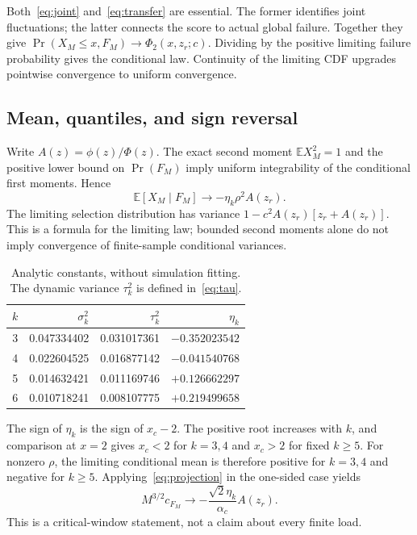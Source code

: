 \documentclass[11pt,a4paper]{article}
\newcommand{\E}{\mathbb E}
\begin{document}
Both~\eqref{eq:joint} and~\eqref{eq:transfer} are essential. The former identifies joint fluctuations; the latter connects the score to actual global failure. Together they give
$\Pr(X_M\le x,F_M)\to\Phi_2(x,z_r;c)$. Dividing by the positive limiting failure probability gives the conditional law. Continuity of the limiting CDF upgrades pointwise convergence to uniform convergence.

\subsection{Mean, quantiles, and sign reversal}
Write $A(z)=\phi(z)/\Phi(z)$. The exact second moment $\E X_M^2=1$ and the positive lower bound on $\Pr(F_M)$ imply uniform integrability of the conditional first moments. Hence
\begin{equation}
\E[X_M\mid F_M]\longrightarrow-\eta_k\rho^2A(z_r).\label{eq:mean}
\end{equation}
The limiting selection distribution has variance
$1-c^2A(z_r)[z_r+A(z_r)]$. This is a formula for the limiting law; bounded second moments alone do not imply convergence of finite-sample conditional variances.

\begin{table}[tbp]
\centering
\caption{Analytic constants, without simulation fitting. The dynamic variance $\tau_k^2$ is defined in~\eqref{eq:tau}.}
\begin{tabular}{rrrr}
\toprule
$k$ & $\sigma_k^2$ & $\tau_k^2$ & $\eta_k$\\
\midrule
3 & 0.047334402 & 0.031017361 & $-0.352023542$\\
4 & 0.022604525 & 0.016877142 & $-0.041540768$\\
5 & 0.014632421 & 0.011169746 & $+0.126662297$\\
6 & 0.010718241 & 0.008107775 & $+0.219499658$\\
\bottomrule
\end{tabular}
\end{table}

The sign of $\eta_k$ is the sign of $x_c-2$. The positive root increases with $k$, and comparison at $x=2$ gives $x_c<2$ for $k=3,4$ and $x_c>2$ for fixed $k\ge5$. For nonzero $\rho$, the limiting conditional mean is therefore positive for $k=3,4$ and negative for $k\ge5$. Applying~\eqref{eq:projection} in the one-sided case yields
\begin{equation}
M^{3/2}c_{F_M}\longrightarrow
-\frac{\sqrt2\eta_k}{\alpha_c}A(z_r).
\end{equation}
This is a critical-window statement, not a claim about every finite load.
\end{document}
